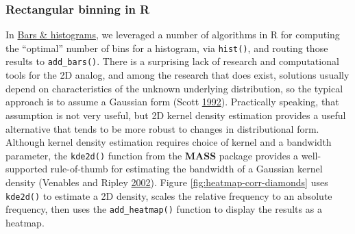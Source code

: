 \documentclass[12pt,]{isuthesis}
\newenvironment{Shaded}{\begin{snugshade}}{\end{snugshade}}
\newcommand{\KeywordTok}[1]{\textcolor[rgb]{0.13,0.29,0.53}{\textbf{{#1}}}}
\newcommand{\DataTypeTok}[1]{\textcolor[rgb]{0.13,0.29,0.53}{{#1}}}
\newcommand{\DecValTok}[1]{\textcolor[rgb]{0.00,0.00,0.81}{{#1}}}
\newcommand{\StringTok}[1]{\textcolor[rgb]{0.31,0.60,0.02}{{#1}}}
\newcommand{\CommentTok}[1]{\textcolor[rgb]{0.56,0.35,0.01}{\textit{{#1}}}}
\newcommand{\NormalTok}[1]{{#1}}
\begin{document}
\subsubsection{Rectangular binning in R}\label{rectangular-binning-in-r}

In \protect\hyperlink{bars-histograms}{Bars \& histograms}, we leveraged
a number of algorithms in R for computing the ``optimal'' number of bins
for a histogram, via \texttt{hist()}, and routing those results to
\texttt{add\_bars()}. There is a surprising lack of research and
computational tools for the 2D analog, and among the research that does
exist, solutions usually depend on characteristics of the unknown
underlying distribution, so the typical approach is to assume a Gaussian
form (Scott \protect\hyperlink{ref-mde}{1992}). Practically speaking,
that assumption is not very useful, but 2D kernel density estimation
provides a useful alternative that tends to be more robust to changes in
distributional form. Although kernel density estimation requires choice
of kernel and a bandwidth parameter, the \texttt{kde2d()} function from
the \textbf{MASS} package provides a well-supported rule-of-thumb for
estimating the bandwidth of a Gaussian kernel density (Venables and
Ripley \protect\hyperlink{ref-MASS}{2002}). Figure
\ref{fig:heatmap-corr-diamonds} uses \texttt{kde2d()} to estimate a 2D
density, scales the relative frequency to an absolute frequency, then
uses the \texttt{add\_heatmap()} function to display the results as a
heatmap.

\begin{Shaded}
\end{Shaded}
\end{document}
